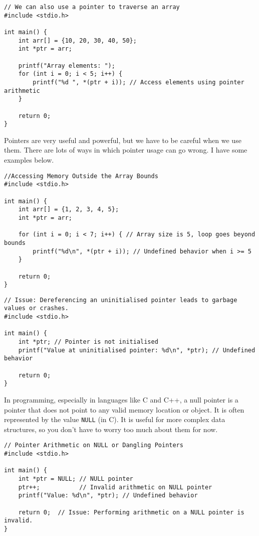 \documentclass[a4paper,12pt]{article}
\begin{document}
\lstset{language=C}
\begin{lstlisting}[caption=Iterating through an array by reference]
// We can also use a pointer to traverse an array
#include <stdio.h>

int main() {
    int arr[] = {10, 20, 30, 40, 50};
    int *ptr = arr;

    printf("Array elements: ");
    for (int i = 0; i < 5; i++) {
        printf("%d ", *(ptr + i)); // Access elements using pointer arithmetic
    }

    return 0;
}

\end{lstlisting}

\newpage

Pointers are very useful and powerful, but we have to be careful when we use them. There are lots of ways in which pointer usage can go wrong. I have some examples below.

\lstset{language=C}
\begin{lstlisting}[caption=Example of out-of-bounds errors]
//Accessing Memory Outside the Array Bounds
#include <stdio.h>

int main() {
    int arr[] = {1, 2, 3, 4, 5};
    int *ptr = arr;

    for (int i = 0; i < 7; i++) { // Array size is 5, loop goes beyond bounds
        printf("%d\n", *(ptr + i)); // Undefined behavior when i >= 5
    }

    return 0;
}
\end{lstlisting}

\begin{lstlisting}[caption=Incorrect pointer referencing]
// Issue: Dereferencing an uninitialised pointer leads to garbage values or crashes.
#include <stdio.h>

int main() {
    int *ptr; // Pointer is not initialised
    printf("Value at uninitialised pointer: %d\n", *ptr); // Undefined behavior

    return 0;
}
\end{lstlisting}

In programming, especially in languages like C and C++, a null pointer is a pointer that does not point to any valid memory location or object. It is often represented by the value \verb|NULL| (in C). It is useful for more complex data structures, so you don't have to worry too much about them for now.

\begin{lstlisting}[caption=NULL and dangling pointer operations]
// Pointer Arithmetic on NULL or Dangling Pointers
#include <stdio.h>

int main() {
    int *ptr = NULL; // NULL pointer
    ptr++;           // Invalid arithmetic on NULL pointer
    printf("Value: %d\n", *ptr); // Undefined behavior

    return 0;  // Issue: Performing arithmetic on a NULL pointer is invalid.
}\end{lstlisting}
\end{document}
